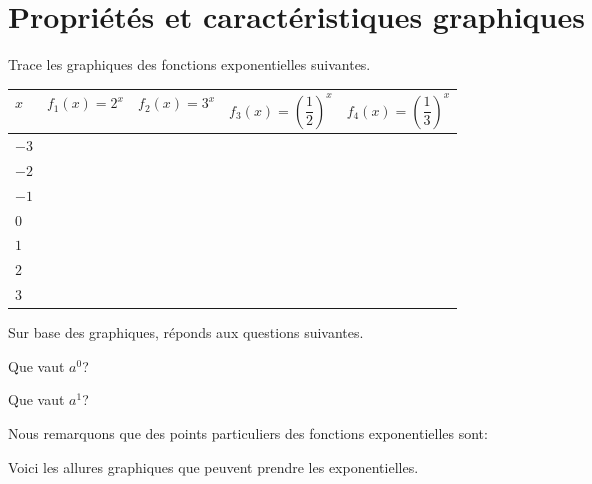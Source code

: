 \documentclass[a4paper,12pt,singlepage]{report}
\begin{document}
\section{Propriétés et caractéristiques graphiques}
\label{sec:orga6d32f9}
\begin{exercice}
Trace les graphiques des fonctions exponentielles suivantes.

\begin{center}
\begin{tabular}{|l|p{2cm}|p{2cm}|p{3cm}|p{3cm}|}
\hline
\(x\) & \(f_1(x)=2^x\) & \(f_2(x)=3^x\) & \(f_3(x)=\left(\dfrac{1}{2}\right)^x\) & \(f_4(x)=\left(\dfrac{1}{3}\right)^x\)\\[0pt]
\hline
\(-3\) &  &  &  & \\[0pt]
\hline
\(-2\) &  &  &  & \\[0pt]
\hline
\(-1\) &  &  &  & \\[0pt]
\hline
\(0\) &  &  &  & \\[0pt]
\hline
\(1\) &  &  &  & \\[0pt]
\hline
\(2\) &  &  &  & \\[0pt]
\hline
\(3\) &  &  &  & \\[0pt]
\hline
\end{tabular}
\end{center}


\begin{center}

\end{center}

\begin{observation}
Sur base des graphiques, réponds aux questions suivantes.

Que vaut \(a^0\)?\dotfill

Que vaut \(a^1\)?\dotfill

Nous remarquons que des points particuliers des fonctions exponentielles sont:
\dotfill
\end{observation}
\end{exercice}
\newpage
Voici les allures graphiques que peuvent prendre les exponentielles.
\begin{center}

\end{center}
\end{document}
